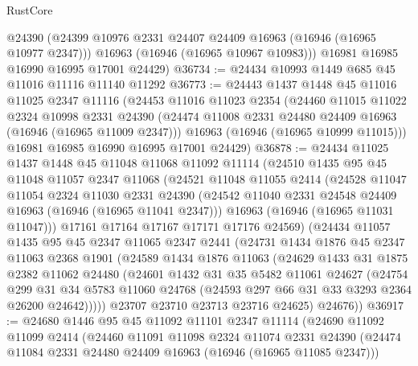 \begin{lexlean}{RustCore}
\begin{coremodule}
        @24390
        (@24399 @10976 @2331 @24407 @24409 @16963 (@16946 (@16965 @10977 @2347)))
        @16963
        (@16946 (@16965 @10967 @10983)))
      @16981
      @16985
      @16990
      @16995
      @17001
      @24429)
@36734 := @24434 @10993 @1449 @685 @45 @11016 @11116 @11140 @11292
@36773 := @24443
    @1437
    @1448
    @45
    @11016
    @11025
    @2347
    @11116
    (@24453
      @11016
      @11023
      @2354
      (@24460
        @11015
        @11022
        @2324
        @10998
        @2331
        @24390
        (@24474 @11008 @2331 @24480 @24409 @16963 (@16946 (@16965 @11009 @2347)))
        @16963
        (@16946 (@16965 @10999 @11015)))
      @16981
      @16985
      @16990
      @16995
      @17001
      @24429)
@36878 := @24434
    @11025
    @1437
    @1448
    @45
    @11048
    @11068
    @11092
    @11114
    (@24510
      @1435
      @95
      @45
      @11048
      @11057
      @2347
      @11068
      (@24521
        @11048
        @11055
        @2414
        (@24528
          @11047
          @11054
          @2324
          @11030
          @2331
          @24390
          (@24542 @11040 @2331 @24548 @24409 @16963 (@16946 (@16965 @11041 @2347)))
          @16963
          (@16946 (@16965 @11031 @11047)))
        @17161
        @17164
        @17167
        @17171
        @17176
        @24569)
      (@24434
        @11057
        @1435
        @95
        @45
        @2347
        @11065
        @2347
        @2441
        (@24731
          @1434
          @1876
          @45
          @2347
          @11063
          @2368
          @1901
          (@24589
            @1434
            @1876
            @11063
            (@24629
              @1433
              @31
              @1875
              @2382
              @11062
              @24480
              (@24601
                @1432
                @31
                @35
                @5482
                @11061
                @24627
                (@24754
                  @299
                  @31
                  @34
                  @5783
                  @11060
                  @24768
                  (@24593 @297 @66 @31 @33 @3293 @2364 @26200 @24642)))))
          @23707
          @23710
          @23713
          @23716
          @24625)
        @24676))
@36917 := @24680
    @1446
    @95
    @45
    @11092
    @11101
    @2347
    @11114
    (@24690
      @11092
      @11099
      @2414
      (@24460
        @11091
        @11098
        @2324
        @11074
        @2331
        @24390
        (@24474 @11084 @2331 @24480 @24409 @16963 (@16946 (@16965 @11085 @2347)))

\end{coremodule}
\end{lexlean}
